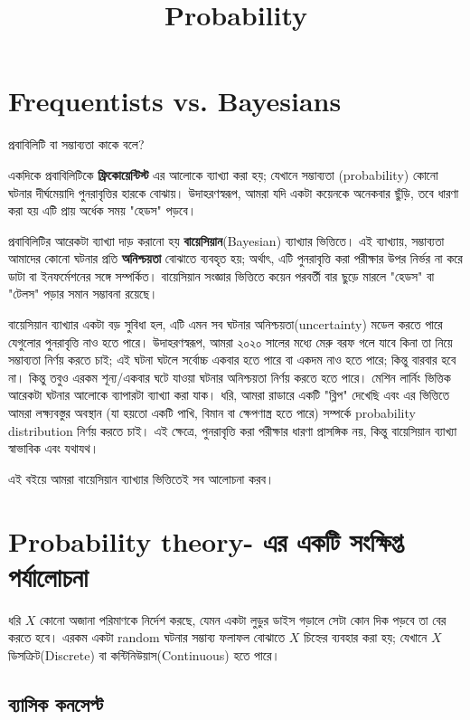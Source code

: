 \documentclass[graybox, envcountchap, twocolumn]{styles/svmult}
\begin{document}
\title{Probability}
{\bengalifont
\section{Frequentists vs. Bayesians}
প্রবাবিলিটি বা সম্ভাব্যতা কাকে বলে?

একদিকে প্রবাবিলিটিকে  \textbf{ফ্রিকোয়েন্টিস্ট} এর আলোকে ব্যাখ্যা করা হয়; যেখানে সম্ভাব্যতা (probability) কোনো ঘটনার দীর্ঘমেয়াদি পুনরাবৃত্তির হারকে বোঝায়। উদাহরণস্বরূপ, আমরা যদি একটা কয়েনকে অনেকবার ছুঁড়ি, তবে ধারণা করা হয় এটি প্রায় অর্ধেক সময় "হেডস" পড়বে।

প্রবাবিলিটির আরেকটা ব্যাখ্যা দাড় করানো হয় \textbf{বায়েসিয়ান}(Bayesian) ব্যাখ্যার ভিত্তিতে। এই ব্যাখ্যায়, সম্ভাব্যতা আমাদের কোনো ঘটনার প্রতি \textbf{অনিশ্চয়তা} বোঝাতে ব্যবহৃত হয়; অর্থাৎ, এটি পুনরাবৃত্তি করা পরীক্ষার উপর নির্ভর না করে ডাটা বা ইনফর্মেশনের সঙ্গে সম্পর্কিত। বায়েসিয়ান সংজ্ঞার ভিত্তিতে কয়েন পরবর্তী বার ছুড়ে মারলে "হেডস" বা "টেলস" পড়ার সমান সম্ভাবনা রয়েছে।    


বায়েসিয়ান ব্যাখ্যার একটা বড় সুবিধা হল, এটি এমন সব ঘটনার অনিশ্চয়তা(uncertainty) মডেল করতে পারে যেগুলোর পুনরাবৃত্তি নাও হতে পারে।  উদাহরণস্বরূপ, আমরা ২০২০ সালের মধ্যে মেরু বরফ গলে যাবে কিনা তা নিয়ে সম্ভাব্যতা নির্ণয় করতে চাই; এই ঘটনা ঘটলে সর্বোচ্চ একবার হতে পারে বা একদম নাও হতে পারে; কিন্তু বারবার হবে না। কিন্তু তবুও এরকম শূন্য/একবার ঘটে যাওয়া ঘটনার অনিশ্চয়তা নির্ণয় করতে হতে পারে। 
মেশিন লার্নিং ভিত্তিক আরেকটা ঘটনার আলোকে ব্যাপারটা ব্যাখ্যা করা যাক। ধরি,  আমরা রাডারে একটি "ব্লিপ" দেখেছি এবং এর ভিত্তিতে আমরা লক্ষ্যবস্তুর অবস্থান (যা হয়তো একটি পাখি, বিমান বা ক্ষেপণাস্ত্র হতে পারে) সম্পর্কে probability distribution নির্ণয় করতে চাই। এই ক্ষেত্রে, পুনরাবৃত্তি করা পরীক্ষার ধারণা প্রাসঙ্গিক নয়, কিন্তু বায়েসিয়ান ব্যাখ্যা স্বাভাবিক এবং যথাযথ।

এই বইয়ে আমরা বায়েসিয়ান ব্যাখ্যার ভিত্তিতেই সব আলোচনা করব। }




\section{Probability theory- {\bengalifont এর একটি সংক্ষিপ্ত পর্যালোচনা}}

{\bengalifont ধরি $𝑋$ কোনো অজানা পরিমাণকে নির্দেশ করছে, যেমন একটা লুডুর ডাইস গড়ালে সেটা কোন দিক পড়বে তা বের করতে হবে। এরকম একটা random ঘটনার সম্ভাব্য ফলাফল বোঝাতে $X$ চিহ্নের ব্যবহার করা হয়; যেখানে $X$ ডিসক্রিট(Discrete) বা কন্টিনিউয়াস(Continuous) হতে পারে।  }

\subsection{{\bengalifont ব্যাসিক কনসেপ্ট}}
\end{document}
